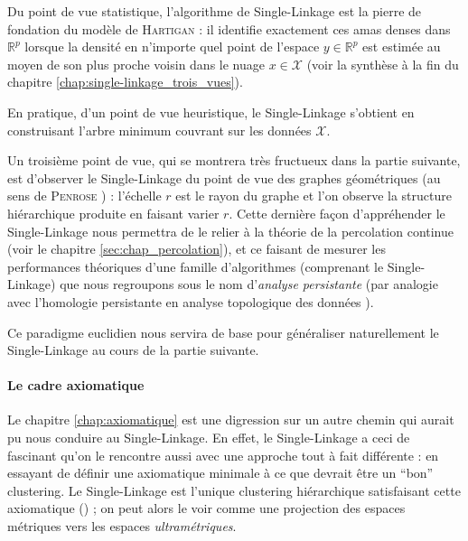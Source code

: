 \documentclass{these-ISSS} %
\begin{document}
Du point de vue statistique, l'algorithme de Single-Linkage est la pierre de fondation du modèle de \textsc{Hartigan} : il identifie exactement ces amas denses dans $\mathbb R^p$ lorsque la densité en n'importe quel point de l'espace $y \in \mathbb R^p$ est estimée au moyen de son plus proche voisin dans le nuage $x\in \mathcal X$ (voir la synthèse à la fin du chapitre \ref{chap:single-linkage_trois_vues}).

En pratique, d'un point de vue heuristique, le Single-Linkage s'obtient en construisant l'arbre minimum couvrant sur les données $\mathcal X$.

Un troisième point de vue, qui se montrera très fructueux dans la partie suivante, est d'observer le Single-Linkage du point de vue des graphes géométriques (au sens de \textsc{Penrose} \cite{penrose2003}) : l'échelle $r$ est le rayon du graphe et l'on observe la structure hiérarchique produite en faisant varier $r$.
Cette dernière façon d'appréhender le Single-Linkage nous permettra de le relier à la théorie de la percolation continue \cite{MeesterRoy, penrose2003} (voir le chapitre \ref{sec:chap_percolation}), et ce faisant de mesurer les performances théoriques d'une famille d'algorithmes (comprenant le Single-Linkage) que nous regroupons sous le nom d'\emph{analyse persistante} (par analogie avec l'homologie persistante en analyse topologique des données \cite{BobrowskiKahle}).

Ce paradigme euclidien nous servira de base pour généraliser naturellement le Single-Linkage au cours de la partie suivante.

\paragraph{Le cadre axiomatique} 
Le chapitre \ref{chap:axiomatique} est une digression sur un autre chemin qui aurait pu nous conduire au Single-Linkage.
En effet, le Single-Linkage a ceci de fascinant qu'on le rencontre aussi avec une approche tout à fait différente : en essayant de définir une axiomatique minimale à ce que devrait être un ``bon'' clustering.
Le Single-Linkage est l'unique clustering hiérarchique satisfaisant cette axiomatique () ; on peut alors le voir comme une projection des espaces métriques vers les espaces \emph{ultramétriques}.
\end{document}
